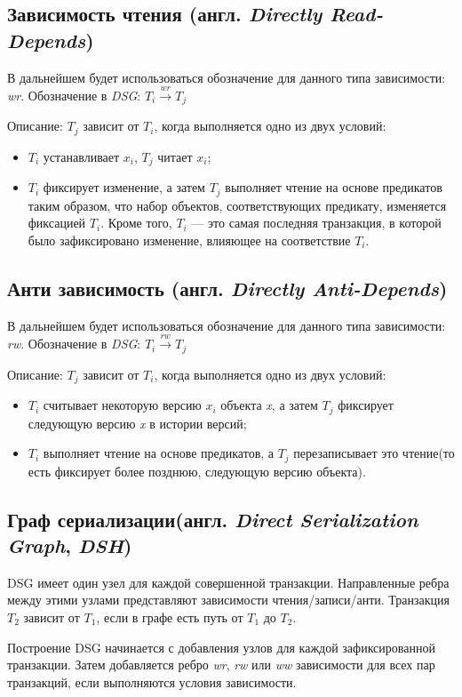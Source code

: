 \documentclass[12pt,  openany]{book}
\begin{document}
\subsection{Зависимость чтения (англ. \textit{Directly Read-Depends})}
В дальнейшем будет использоваться обозначение для данного типа зависимости: \textit{wr}. Обозначение в \textit{DSG}: $T_i  \xrightarrow{\textit{wr}} T_j$
\par
Описание: $T_j$ зависит от $T_i$,  когда выполняется одно из двух условий:
\begin{itemize}
\item $T_i$ устанавливает $x_i$, $T_j$ читает $x_i$;
\item $T_i$ фиксирует изменение, а затем $T_j$ выполняет чтение на основе предикатов таким образом, что набор объектов, соответствующих предикату, изменяется фиксацией $T_i$.   Кроме того, $T_i$ --- это самая последняя транзакция, в которой было зафиксировано изменение, влияющее на соответствие $T_i$.
\end{itemize}

\subsection{Анти зависимость (англ. \textit{Directly Anti-Depends})}
В дальнейшем будет использоваться обозначение для данного типа зависимости: \textit{rw}. Обозначение в \textit{DSG}: $T_i  \xrightarrow{\textit{rw}} T_j$
\par
Описание: $T_j$ зависит от $T_i$,  когда выполняется одно из двух условий:
\begin{itemize}
\item $T_i$ считывает некоторую версию $x_i$ объекта \textit{x}, а затем $T_j$  фиксирует следующую версию \textit{x} в истории версий;
\item $T_i$ выполняет чтение на основе предикатов, а $T_j$ перезаписывает это чтение(то есть фиксирует более позднюю, следующую версию  объекта).
\end{itemize}

\subsection{Граф сериализации(англ. \textit{Direct Serialization Graph}, \textit{DSH})}
DSG имеет один узел для каждой совершенной транзакции. Направленные ребра между этими узлами представляют зависимости чтения/записи/анти. Транзакция $T_2$ зависит от $T_1$, если в графе есть путь от $T_1$ до $T_2$. 
\par
Построение DSG начинается с добавления узлов для каждой зафиксированной транзакции. Затем добавляется ребро \textit{wr}, \textit{rw} или \textit{ww} зависимости для всех пар транзакций, если выполняются условия зависимости.
\end{document}
